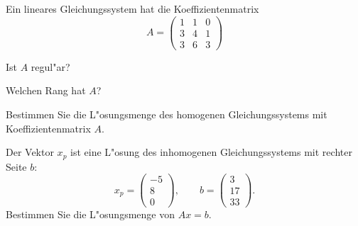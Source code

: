 Ein lineares Gleichungssystem hat die Koeffizientenmatrix
\[
A=\begin{pmatrix}
1&1&0\\
3&4&1\\
3&6&3
\end{pmatrix}
\]
\begin{teilaufgaben}
\item Ist $A$ regul"ar?
\item Welchen Rang hat $A$?
\item Bestimmen Sie die L"osungsmenge des homogenen Gleichungssystems mit
Koeffizientenmatrix $A$.
\item Der Vektor $x_p$ ist eine L"osung des inhomogenen Gleichungssystems mit
rechter Seite $b$:
\[
x_p=
\begin{pmatrix}
-5\\8\\0
\end{pmatrix}
,\qquad
b=\begin{pmatrix}
3\\17\\33
\end{pmatrix}.
\]
Bestimmen Sie die L"osungsmenge von $Ax=b$.
\end{teilaufgaben}

